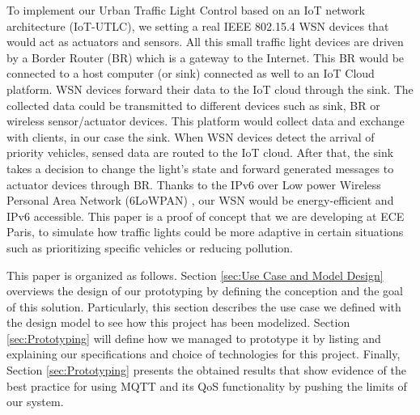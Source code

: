 To implement our Urban Traffic Light Control based on an IoT network architecture (IoT-UTLC),
	we setting a real IEEE 802.15.4 WSN devices that would act as actuators and sensors.
All this small traffic light devices are driven by a Border Router (BR) which is a gateway to the Internet.
This BR would be connected to a host computer (or sink) connected as well to an IoT Cloud platform.
WSN devices forward their data to the IoT cloud through the sink.
The collected data could be transmitted to different devices such as sink,
	BR or wireless sensor/actuator devices.
This platform would collect data and exchange with clients,
	in our case the sink.
When WSN devices detect the arrival of priority vehicles,
	sensed data are routed to the IoT cloud.
After that,
	the sink takes a decision to change the light's state and forward generated messages to actuator devices through BR.
Thanks to the IPv6 over Low power Wireless Personal Area Network (6LoWPAN) \cite{chalappuram_development_2016},
	our WSN would be energy-efficient and IPv6 accessible.
This paper is a proof of concept that we are developing at ECE Paris,
	to simulate how traffic lights could be more adaptive in certain situations such as prioritizing specific vehicles or reducing pollution.


This paper is organized as follows.
Section \ref{sec:Use Case and Model Design} overviews the design of our prototyping by defining the conception and the goal of this solution.
Particularly,
	this section describes the use case we defined with the design model to see how this project has been modelized.
Section \ref{sec:Prototyping} will define how we managed to prototype it by listing and explaining our specifications and choice of technologies for this project.
Finally,
	Section \ref{sec:Prototyping} presents the obtained results that show evidence of the best practice for using MQTT and its QoS functionality by pushing the limits of our system.

